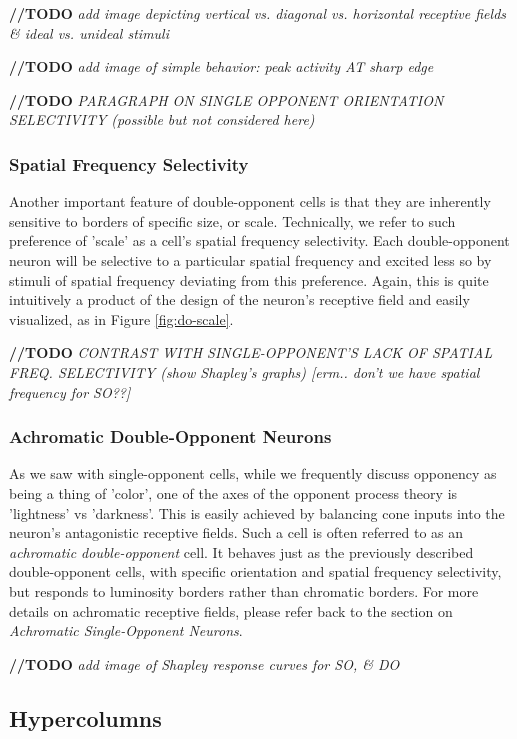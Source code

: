 \documentclass[journal,onecolumn]{IEEEtran}
\begin{document}
\textbf{//TODO} \textit{add image depicting vertical vs. diagonal vs. horizontal receptive fields \& ideal vs. unideal stimuli}

\textbf{//TODO} \textit{add image of simple behavior: peak activity AT sharp edge}

\textbf{//TODO} \textit{PARAGRAPH ON SINGLE OPPONENT ORIENTATION SELECTIVITY (possible but not considered here)}


\subsubsection*{Spatial Frequency Selectivity}

Another important feature of double-opponent cells is that they are inherently sensitive to borders of specific size, or scale. Technically, we refer to such preference of 'scale' as a cell's spatial frequency selectivity. Each double-opponent neuron will be selective to a particular spatial frequency and excited less so by stimuli of spatial frequency deviating from this preference. Again, this is quite intuitively a product of the design of the neuron's receptive field and easily visualized, as in Figure \ref{fig:do-scale}.

\textbf{//TODO} \textit{CONTRAST WITH SINGLE-OPPONENT'S LACK OF SPATIAL FREQ. SELECTIVITY (show Shapley's graphs) [erm.. don't we have spatial frequency for SO??]}


\subsubsection*{Achromatic Double-Opponent Neurons}

As we saw with single-opponent cells, while we frequently discuss opponency as being a thing of 'color', one of the axes of the opponent process theory is 'lightness' vs 'darkness'. This is easily achieved by balancing cone inputs into the neuron's antagonistic receptive fields. Such a cell is often referred to as an \textit{achromatic double-opponent} cell. It behaves just as the previously described double-opponent cells, with specific orientation and spatial frequency selectivity, but responds to luminosity borders rather than chromatic borders. For more details on achromatic receptive fields, please refer back to the section on \textit{Achromatic Single-Opponent Neurons}.

\textbf{//TODO} \textit{add image of Shapley response curves for SO, \& DO}

\subsection*{Hypercolumns}
\end{document}
